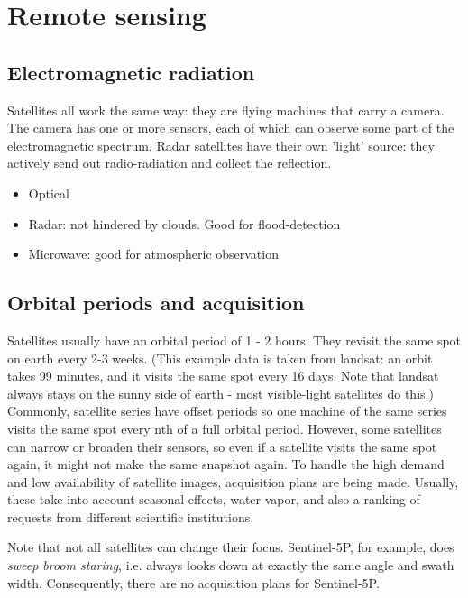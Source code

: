 \section{Remote sensing}


\subsection{Electromagnetic radiation}
Satellites all work the same way: they are flying machines that carry a camera. The camera has one or more sensors, each of which can observe some part of the electromagnetic spectrum.
Radar satellites have their own 'light' source: they actively send out radio-radiation and collect the reflection.

\begin{itemize}
    \item Optical
    \item Radar: not hindered by clouds. Good for flood-detection
    \item Microwave: good for atmospheric observation
\end{itemize}





\subsection{Orbital periods and acquisition}
Satellites usually have an orbital period of 1 - 2 hours. They revisit the same spot on earth every 2-3 weeks.
(This example data is taken from landsat: an orbit takes 99 minutes, and it visits the same spot every 16 days.
Note that landsat always stays on the sunny side of earth - most visible-light satellites do this.)
Commonly, satellite series have offset periods so one machine of the same series
visits the same spot every nth of a full orbital period.
However, some satellites can narrow or broaden their sensors, so even if
a satellite visits the same spot again, it might not make the same snapshot again.
To handle the high demand and low availability of satellite images, acquisition plans are being made.
Usually, these take into account seasonal effects,
water vapor, and also a ranking of requests from different scientific institutions.


Note that not all satellites can change their focus. Sentinel-5P, for example, does \emph{sweep broom staring}, i.e. always looks down at exactly the same angle and swath width.
Consequently, there are no acquisition plans for Sentinel-5P.







